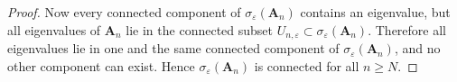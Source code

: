 \documentclass[11pt]{article}
\begin{document}
\begin{proof}
Now every connected component of $\sigma_\varepsilon(\mathbf{A}_n)$ contains an eigenvalue, but
all eigenvalues of $\mathbf{A}_n$ lie in the connected subset
$U_{n,\varepsilon}\subset\sigma_\varepsilon(\mathbf{A}_n)$. Therefore all eigenvalues lie in one and
the same connected component of $\sigma_\varepsilon(\mathbf{A}_n)$, and no other component can
exist. Hence $\sigma_\varepsilon(\mathbf{A}_n)$ is connected for all $n\ge N$.
\end{proof}
\end{document}

